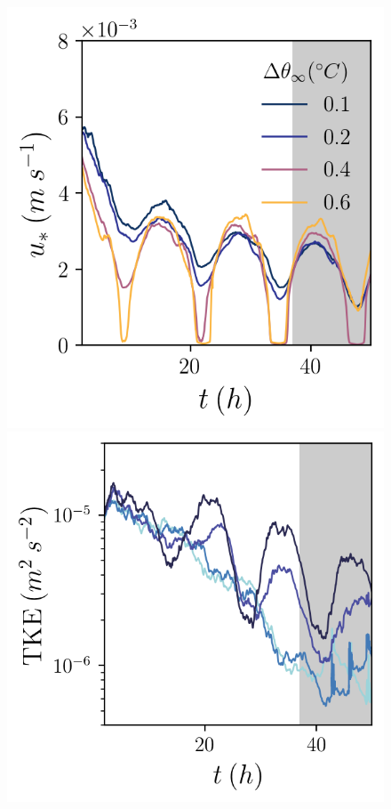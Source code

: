 \documentclass[draft]{styles/agujournal2019}
\begin{document}
\begin{figure}[h!]
\begin{minipage}{0.33\textwidth}
    \end{minipage}%
    \begin{minipage}{0.33\textwidth}
        \includegraphics[trim={0 0 0 0},clip,width=\textwidth]{Figures/us_cmp_dT_t.png}
    \end{minipage}
    \begin{minipage}{0.33\textwidth}
        \includegraphics[trim={0 0 0 0},clip,width=\textwidth]{Figures/tke_cmp_dslope_t.png}

\end{minipage}
\end{figure}
\end{document}
